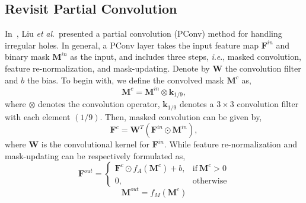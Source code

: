 \documentclass[10pt,journal,compsoc]{IEEEtran}
\newcommand{\ie}{\textit{i}.\textit{e}.}
\newcommand{\etal}{\textit{et} \textit{al}.}
\begin{document}
\subsection{Revisit Partial Convolution}\label{sec3.1}
%
In~\cite{partialconv2017}, Liu \etal~presented a partial convolution (PConv) method for handling irregular holes.
%
In general, a PConv layer takes the input feature map $\mathbf{F}^{in}$ and binary mask $\mathbf{M}^{in}$ as the input, and includes three steps, \ie, masked convolution, feature re-normalization, and mask-updating.
%
Denote by $\mathbf{W}$ the convolution filter and $b$ the bias.
%
To begin with, we define the convolved mask $\mathbf{M}^c$ as,
%
\begin{equation}\label{eqn:conv_mask}
	\mathbf{M}^c = \mathbf{M}^{in} \otimes \mathbf{k}_{{1}/{9}},
\end{equation}
%
where $\otimes$ denotes the convolution operator, $\mathbf{k}_{{1}/{9}}$ denotes a $3 \times 3$ convolution filter with each element {$({1}/{9})$}.
%
%
%
%
%
%
%
Then, masked convolution can be given by,
%
\begin{equation}\label{PConv-1}
	\mathbf{F}^{c} = \mathbf{W}^{T}(\mathbf{F}^{in} \odot \mathbf{M}^{in}),
\end{equation}
%
where $\mathbf{W}$ is the convolutional kernel for $\mathbf{F}^{in}$.
%
While feature re-normalization and mask-updating can be respectively formulated as,
%
\begin{equation}\label{PConv-2}
	\mathbf{F}^{out} =
	\begin{cases}
		\mathbf{F}^{c} \odot f_A(\mathbf{M}^c) + b, & \mbox{if}\ \mathbf{M}^c > 0 \\
		0, & \mbox{otherwise}
	\end{cases}
\end{equation}
%
\begin{equation}\label{PConv-3}
	\mathbf{M}^{out} = f_M(\mathbf{M}^c)
\end{equation}
\end{document}

